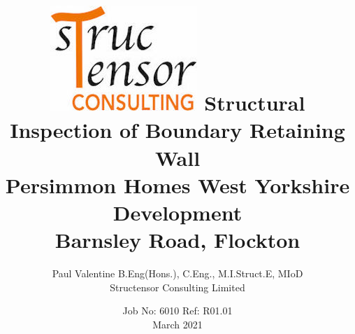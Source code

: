 \renewcommand{\baselinestretch}{1}
\usepackage{lastpage}
\usepackage{fancyhdr}
\pagestyle{fancy}
\fancyhf{}
\renewcommand{\headrulewidth}{0pt} 
\geometry{a4paper,left=25mm, top=20mm}
\author{Paul Valentine B.Eng(Hons.), C.Eng., M.I.Struct.E, MIoD \\ Structensor Consulting Limited}
\title{\includegraphics[scale=0.50]{structensor_logo}\bigbreak
\textbf{Structural Inspection of Boundary Retaining Wall \\
Persimmon Homes West Yorkshire Development \\
Barnsley Road, Flockton}\bigbreak}
\date{Job No: 6010 Ref: R01.01\\March 2021}